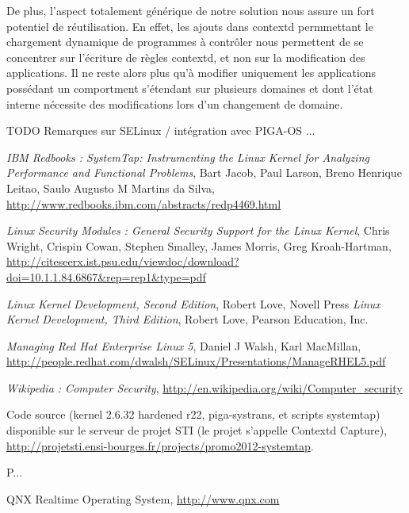 \documentclass[pdftex,a4paper,titlepage,11pt]{article}
\begin{document}
De plus, l'aspect totalement générique de notre solution nous assure un fort potentiel de réutilisation. En effet, les ajouts dans contextd permmettant le chargement dynamique de programmes à contrôler nous permettent de se concentrer sur l'écriture de règles contextd, et non sur la modification des applications. Il ne reste alors plus qu'à modifier uniquement les applications possédant un comportment s'étendant sur plusieurs domaines et dont l'état interne nécessite des modifications lors d'un changement de domaine.

TODO Remarques sur SELinux / intégration avec PIGA-OS ...


\newpage

\begin{thebibliography}{40}

 \textit{IBM Redbooks : SystemTap: Instrumenting the Linux Kernel for Analyzing Performance and Functional Problems}, Bart Jacob, Paul Larson, Breno Henrique Leitao, Saulo Augusto M Martins da Silva, \url{http://www.redbooks.ibm.com/abstracts/redp4469.html}

 \textit{Linux Security Modules : General Security Support for the Linux Kernel}, Chris Wright, Crispin Cowan, Stephen Smalley, James Morris, Greg Kroah-Hartman, \url{http://citeseerx.ist.psu.edu/viewdoc/download?doi=10.1.1.84.6867&rep=rep1&type=pdf}

 \textit{Linux Kernel Development, Second Edition}, Robert Love, Novell Press
 \textit{Linux Kernel Development, Third Edition}, Robert Love, Pearson Education, Inc.

 \textit{Managing Red Hat Enterprise Linux 5}, Daniel J Walsh, Karl MacMillan, \url{http://people.redhat.com/dwalsh/SELinux/Presentations/ManageRHEL5.pdf}

 \textit{Wikipedia : Computer Security}, \url{http://en.wikipedia.org/wiki/Computer_security}

 Code source (kernel 2.6.32 hardened r22, piga-systrans, et scripts systemtap) disponible sur le serveur de projet STI (le projet s'appelle Contextd Capture), \url{http://projetsti.ensi-bourges.fr/projects/promo2012-systemtap}.

 P...

 QNX Realtime Operating System, \url{http://www.qnx.com}

\end{thebibliography}

\end{document}
